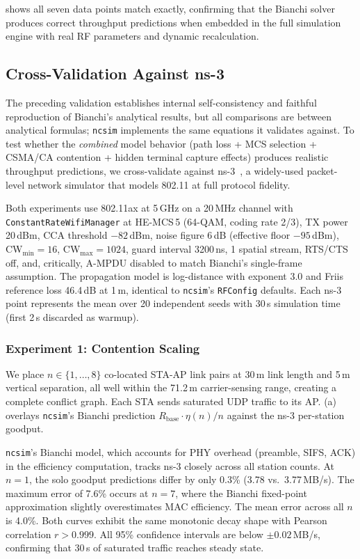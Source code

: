 \documentclass[conference]{IEEEtran}
\newcommand{\ncsim}{\texttt{ncsim}}
\begin{document}
 shows all seven data points match exactly, confirming
that the Bianchi solver produces correct throughput predictions when
embedded in the full simulation engine with real RF parameters and
dynamic recalculation.


\subsection{Cross-Validation Against ns-3}
\label{sec:ns3_validation}

The preceding validation establishes internal self-consistency and faithful
reproduction of Bianchi's analytical results, but all comparisons are between
analytical formulas; \ncsim{} implements the same equations it validates against.
To test whether the \emph{combined} model behavior (path loss + MCS selection +
CSMA/CA contention + hidden terminal capture effects) produces realistic
throughput predictions, we cross-validate against ns-3~\cite{ns3}, a
widely-used packet-level network simulator that models 802.11 at full protocol
fidelity.

Both experiments use 802.11ax at 5\,GHz on a 20\,MHz channel with
\texttt{ConstantRateWifiManager} at HE-MCS\,5 (64-QAM, coding rate 2/3),
TX power 20\,dBm, CCA threshold $-82$\,dBm, noise figure 6\,dB (effective
floor $-95$\,dBm), CW$_{\min}{=}16$, CW$_{\max}{=}1024$, guard interval
3200\,ns, 1 spatial stream, RTS/CTS off, and, critically, A-MPDU disabled to
match Bianchi's single-frame assumption.  The propagation model is
log-distance with exponent 3.0 and Friis reference loss 46.4\,dB at 1\,m,
identical to \ncsim{}'s \texttt{RFConfig} defaults.  Each ns-3 point
represents the mean over 20 independent seeds with 30\,s simulation time
(first 2\,s discarded as warmup).

\subsubsection{Experiment 1: Contention Scaling}

We place $n \in \{1, \ldots, 8\}$ co-located STA-AP link pairs at 30\,m
link length and 5\,m vertical separation, all well within the 71.2\,m
carrier-sensing range, creating a complete conflict graph.  Each STA sends
saturated UDP traffic to its AP.  (a) overlays
\ncsim{}'s Bianchi prediction $R_{\text{base}} \cdot \eta(n)/n$ against the
ns-3 per-station goodput.

\ncsim{}'s Bianchi model, which accounts for PHY overhead (preamble, SIFS,
ACK) in the efficiency computation, tracks ns-3 closely across all station
counts.  At $n{=}1$, the solo goodput predictions differ by only 0.3\%
(3.78 vs.\ 3.77\,MB/s).  The maximum error of 7.6\% occurs at $n{=}7$,
where the Bianchi fixed-point approximation slightly overestimates MAC
efficiency.  The mean error across all $n$ is 4.0\%.  Both curves exhibit
the same monotonic decay shape with Pearson correlation $r > 0.999$.  All
95\% confidence intervals are below $\pm 0.02$\,MB/s, confirming that
30\,s of saturated traffic reaches steady state.
\end{document}
